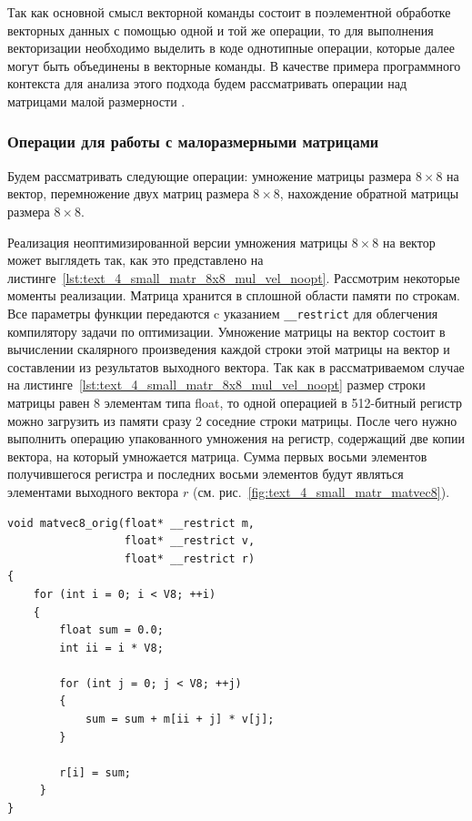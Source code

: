 Так как основной смысл векторной команды состоит в поэлементной обработке векторных данных с помощью одной и той же операции, то для выполнения векторизации необходимо выделить в коде однотипные операции, которые далее могут быть объединены в векторные команды.
В качестве примера программного контекста для анализа этого подхода будем рассматривать операции над матрицами малой размерности \cite{Bendersky2018VecMat2}.

\subsubsection{Операции для работы с малоразмерными матрицами}\label{sec:vec_small_matr_opers}

Будем рассматривать следующие операции: умножение матрицы размера $8 \times 8$ на вектор, перемножение двух матриц размера $8 \times 8$, нахождение обратной матрицы размера $8 \times 8$.

Реализация неоптимизированной версии умножения матрицы $8 \times 8$ на вектор может выглядеть так, как это представлено на листинге~\ref{lst:text_4_small_matr_8x8_mul_vel_noopt}.
Рассмотрим некоторые моменты реализации.
Матрица хранится в сплошной области памяти по строкам.
Все параметры функции передаются c указанием \texttt{\_\_restrict} для облегчения компилятору задачи по оптимизации.
Умножение матрицы на вектор состоит в вычислении скалярного произведения каждой строки этой матрицы на вектор и составлении из результатов выходного вектора.
Так как в рассматриваемом случае на листинге~\ref{lst:text_4_small_matr_8x8_mul_vel_noopt} размер строки матрицы равен 8 элементам типа float, то одной операцией в 512-битный регистр можно загрузить из памяти сразу 2 соседние строки матрицы.
После чего нужно выполнить операцию упакованного умножения на регистр, содержащий две копии вектора, на который умножается матрица.
Сумма первых восьми элементов получившегося регистра и последних восьми элементов будут являться элементами выходного вектора $r$ (см. рис.~\ref{fig:text_4_small_matr_matvec8}).

\begin{singlespace}
\begin{lstlisting}[caption={Невекторизованная версия умножения матрицы \\ размера $8 \times 8$ на вектор.},label={lst:text_4_small_matr_8x8_mul_vel_noopt}]
void matvec8_orig(float* __restrict m,
                  float* __restrict v,
                  float* __restrict r)
{
    for (int i = 0; i < V8; ++i)
    {
        float sum = 0.0;
        int ii = i * V8;

        for (int j = 0; j < V8; ++j)
        {
            sum = sum + m[ii + j] * v[j];
        }

        r[i] = sum;
     }
}
\end{lstlisting}
\end{singlespace}

